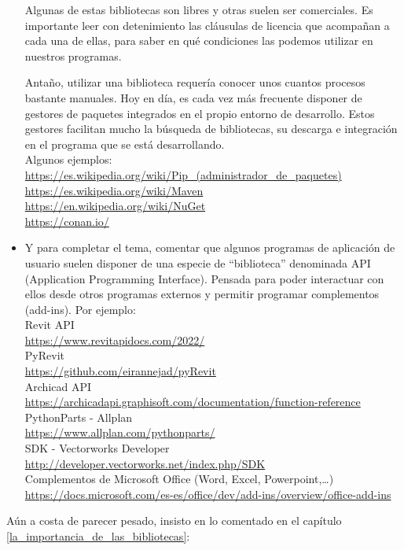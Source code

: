 \documentclass[spanish,12pt,a4paper,final,oneside]{book}
\begin{document}
\begin{itemize}
Algunas de estas bibliotecas son libres y otras suelen ser comerciales. Es importante leer con detenimiento las cláusulas de licencia que acompañan a cada una de ellas, para saber en qué condiciones las podemos utilizar en nuestros programas.

Antaño, utilizar una biblioteca requería conocer unos cuantos procesos bastante manuales. Hoy en día, es cada vez más frecuente disponer de gestores de paquetes integrados en el propio entorno de desarrollo. Estos gestores facilitan mucho la búsqueda de bibliotecas, su descarga e integración en el programa que se está desarrollando.
\\Algunos ejemplos:
\\ \url{https://es.wikipedia.org/wiki/Pip_(administrador_de_paquetes)}
\\ \url{https://es.wikipedia.org/wiki/Maven}
\\ \url{https://en.wikipedia.org/wiki/NuGet}
\\ \url{https://conan.io/}


\item Y para completar el tema, comentar que algunos programas de aplicación de usuario suelen disponer de una especie de ``biblioteca'' denominada API (Application Programming Interface). Pensada para poder interactuar con ellos desde otros programas externos y permitir programar complementos (add-ins). Por ejemplo:
\\ Revit API
\\ \url{https://www.revitapidocs.com/2022/}
\\ PyRevit
\\ \url{https://github.com/eirannejad/pyRevit}
\\ Archicad API
\\ \url{https://archicadapi.graphisoft.com/documentation/function-reference}
\\ PythonParts - Allplan
\\ \url{https://www.allplan.com/pythonparts/}
\\ SDK - Vectorworks Developer \\ \url{http://developer.vectorworks.net/index.php/SDK}
\\ Complementos de Microsoft Office (Word, Excel, Powerpoint,\ldots)
\\ \url{https://docs.microsoft.com/es-es/office/dev/add-ins/overview/office-add-ins}

\end{itemize}


Aún a costa de parecer pesado, insisto en lo comentado en el capítulo \ref{la_importancia_de_las_bibliotecas}:
\end{document}
